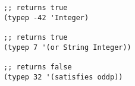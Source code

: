 \begin{lstlisting}[style=reclojureClojure]
;; returns true
(typep -42 'Integer)

;; returns true
(typep 7 '(or String Integer))

;; returns false
(typep 32 '(satisfies oddp))
\end{lstlisting}
